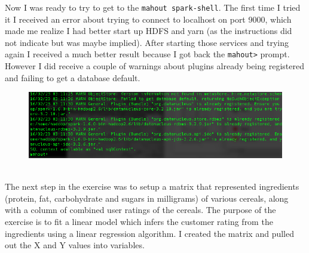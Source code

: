 \documentclass[10pt]{article}
\begin{document}
%
\hfill
{}%
\par
Now I was ready to try to get to the \verb|mahout spark-shell|. The first time I tried it I received an error about trying to connect to localhost on port 9000, which made me realize I had better start up HDFS and yarn (as the instructions did not indicate but was maybe implied). After starting those services and trying again I received a much better result because I got back the \verb|mahout>| prompt. However I did receive a couple of warnings about plugins already being registered and failing to get a database default.
\begin{figure}[!h]
\includegraphics[scale=0.37]{already_registered.png}
\centering
\end{figure}\\
\indent The next step in the exercise was to setup a matrix that represented ingredients (protein, fat, carbohydrate and sugars in milligrams) of various cereals, along with a column of combined user ratings of the cereals. The purpose of the exercise is to fit a linear model which infers the customer rating from the ingredients using a linear regression algorithm. I created the matrix and pulled out the X and Y values into variables.
\end{document}
